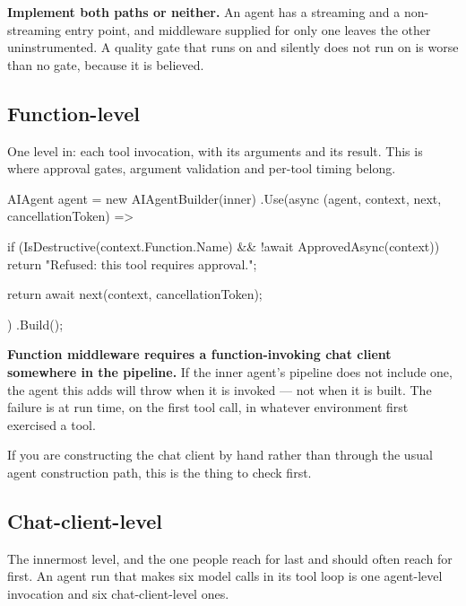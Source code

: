 \begin{warning}
\textbf{Implement both paths or neither.} An agent has a streaming and a
non-streaming entry point, and middleware supplied for only one leaves the other
uninstrumented. A quality gate that runs on  and silently does not
run on  is worse than no gate, because it is believed.
\end{warning}

\subsection{Function-level}

One level in: each tool invocation, with its arguments and its result. This is
where approval gates, argument validation and per-tool timing belong.

\begin{csharp}[caption={Intercepting tool calls}, label={lst:obs-function-mw}]
AIAgent agent = new AIAgentBuilder(inner)
    .Use(async (agent, context, next, cancellationToken) =>
    {
        if (IsDestructive(context.Function.Name) && !await ApprovedAsync(context))
        {
            return "Refused: this tool requires approval.";
        }

        return await next(context, cancellationToken);
    })
    .Build();
\end{csharp}

\begin{warning}
\textbf{Function middleware requires a function-invoking chat client somewhere in
the pipeline.} If the inner agent's pipeline does not include one, the agent this
adds will throw when it is invoked --- not when it is built. The failure is at run
time, on the first tool call, in whatever environment first exercised a tool.

If you are constructing the chat client by hand rather than through the usual
agent construction path, this is the thing to check first.
\end{warning}

\subsection{Chat-client-level}

The innermost level, and the one people reach for last and should often reach for
first. An agent run that makes six model calls in its tool loop is one agent-level
invocation and six chat-client-level ones.


